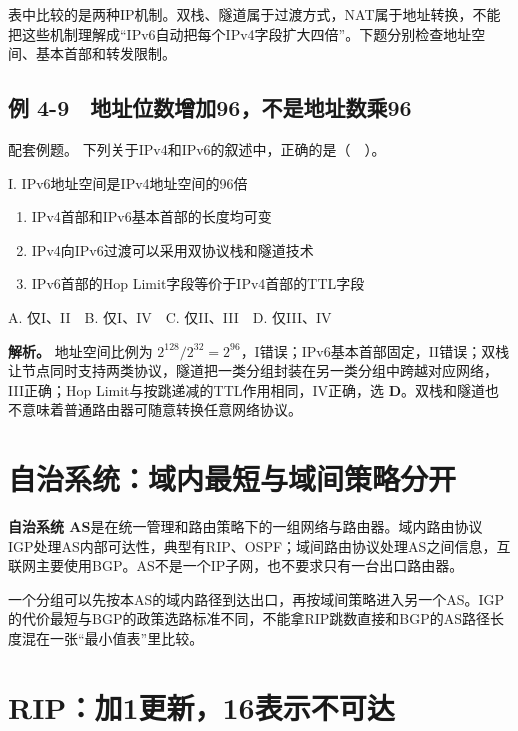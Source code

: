 表中比较的是两种IP机制。双栈、隧道属于过渡方式，NAT属于地址转换，不能把这些机制理解成``IPv6自动把每个IPv4字段扩大四倍''。下题分别检查地址空间、基本首部和转发限制。

\subsection{例 4-9　地址位数增加96，不是地址数乘96}\label{CN04-ex9}

\begin{example}[配套例题]

配套例题。 下列关于IPv4和IPv6的叙述中，正确的是（　）。

I. IPv6地址空间是IPv4地址空间的96倍

\begin{enumerate}
\def\labelenumi{\Roman{enumi}.}
\setcounter{enumi}{1}
\item
  IPv4首部和IPv6基本首部的长度均可变
\item
  IPv4向IPv6过渡可以采用双协议栈和隧道技术
\item
  IPv6首部的Hop Limit字段等价于IPv4首部的TTL字段
\end{enumerate}

A. 仅I、II　B. 仅I、IV　C. 仅II、III　D. 仅III、IV

\end{example}

\textbf{解析。} 地址空间比例为 \(2^{128}/2^{32}=2^{96}\)，I错误；IPv6基本首部固定，II错误；双栈让节点同时支持两类协议，隧道把一类分组封装在另一类分组中跨越对应网络，III正确；Hop Limit与按跳递减的TTL作用相同，IV正确，选 \textbf{D}。双栈和隧道也不意味着普通路由器可随意转换任意网络协议。

\section{自治系统：域内最短与域间策略分开}\label{CN04-15}

\textbf{自治系统 AS}是在统一管理和路由策略下的一组网络与路由器。域内路由协议 IGP处理AS内部可达性，典型有RIP、OSPF；域间路由协议处理AS之间信息，互联网主要使用BGP。AS不是一个IP子网，也不要求只有一台出口路由器。

一个分组可以先按本AS的域内路径到达出口，再按域间策略进入另一个AS。IGP的代价最短与BGP的政策选路标准不同，不能拿RIP跳数直接和BGP的AS路径长度混在一张``最小值表''里比较。

\section{RIP：加1更新，16表示不可达}\label{CN04-16}

